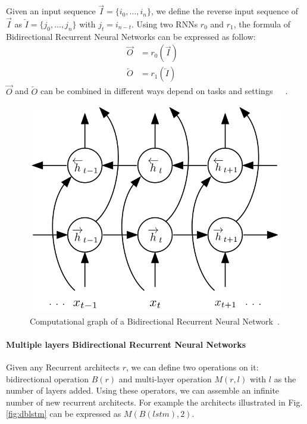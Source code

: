 Given an input sequence \(\overrightarrow{I} = \{i_0,\ldots,i_n\}\), we define the reverse input sequence of \(\overrightarrow{I}\) as \(\overleftarrow{I} = \{j_0,\ldots,j_n\}\) with \(j_t = i_{n-t}\).
Using two RNNs \(r_0\) and \(r_1\), the formula of Bidirectional Recurrent Neural Networks can be expressed as follow:
\begin{align}
    \overrightarrow{O} &= r_0(\overrightarrow{I}) &\\
    \overleftarrow{O} &= r_1(\overleftarrow{I}) &
\end{align}
\(\overrightarrow{O}\) and \(\overleftarrow{O}\) can be combined in different ways depend on tasks and settings~\cite{GravesLSTM}~\cite{Graves-thesis}~\cite{treeLSTM}.

\begin{figure}[H]
    \centering
    \includegraphics[scale=0.4]{figure/blstm}
    \caption[Bidirectional Recurrent Neural Network]{Computational graph of a Bidirectional Recurrent Neural Network~\cite{GravesLSTM}.}
    \label{fig:blstm}
\end{figure}

\paragraph{Multiple layers Bidirectional Recurrent Neural Networks}
Given any Recurrent architects \(r\), we can define two operations on it: bidirectional operation \(B(r)\) and multi-layer operation \(M(r, l)\) with \(l\) as the number of layers added.
Using these operators, we can assemble an infinite number of new recurrent architects.
For example the architects illustrated in Fig.\ref{fig:dblstm} can be expressed as \(M(B(lstm), 2)\).

